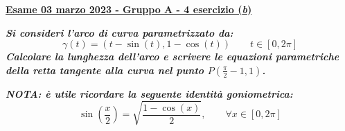 \documentclass[a4paper]{article}
\newcommand{\definition}[1]{\textcolor{Red3}{\textbf{#1}}}
\newcommand{\example}[1]{\textcolor{Green4}{\textbf{#1}}}
\begin{document}
	\begin{flushleft}
		\label{exam: esame 03 marzo 2023 - Gruppo A - 4 esercizio (b)}
		\hypertarget{
			exam: esame 03 marzo 2023 - Gruppo A - 4 esercizio (b)
		}{
			\definition{\underline{Esame 03 marzo 2023 - Gruppo A - 4 esercizio (\emph{b})}}
		}
	\end{flushleft}
	\example{\emph{Si consideri l'arco di curva parametrizzato da:}
	\begin{equation*}
		\gamma\left(t\right) = \left(t-\sin\left(t\right), 1-\cos\left(t\right)\right) \hspace{2em} t \in \left[0, 2\pi\right]
	\end{equation*}
	\emph{Calcolare la lunghezza dell'arco e scrivere le equazioni parametriche della retta tangente alla curva nel punto $P\left(\frac{\pi}{2}-1, 1\right)$.}}

	\noindent
	\example{\emph{NOTA: è utile ricordare la seguente identità goniometrica:}
	\begin{equation*}
		\sin\left(\dfrac{x}{2}\right) = \sqrt{\dfrac{1-\cos\left(x\right)}{2}}, \hspace{2em} \forall x \in \left[0,2\pi\right]
	\end{equation*}}
\end{document}
